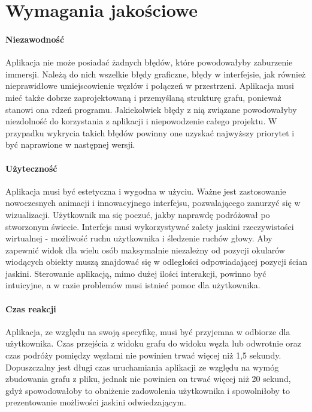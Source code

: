 \section{Wymagania jakościowe}

\paragraph{Niezawodność}
Aplikacja nie może posiadać żadnych błędów, które powodowałyby zaburzenie immersji. Należą do nich wszelkie błędy graficzne, błędy w interfejsie, jak również nieprawidłowe umiejscowienie węzłów i połączeń w przestrzeni. Aplikacja musi mieć także dobrze zaprojektowaną i przemyślaną strukturę grafu, ponieważ stanowi ona rdzeń programu. Jakiekolwiek błędy z nią związane powodowałyby niezdolność do korzystania z aplikacji i niepowodzenie całego projektu. W przypadku wykrycia takich błędów powinny one uzyskać najwyższy priorytet i być naprawione w następnej wersji.

\paragraph{Użyteczność}
Aplikacja musi być estetyczna i wygodna w użyciu. Ważne jest zastosowanie nowoczesnych animacji i innowacyjnego interfejsu, pozwalającego zanurzyć się w wizualizacji. Użytkownik ma się poczuć, jakby naprawdę podróżował po stworzonym świecie. Interfejs musi wykorzystywać zalety jaskini rzeczywistości wirtualnej - możliwość ruchu użytkownika i śledzenie ruchów głowy. Aby zapewnić widok dla wielu osób maksymalnie niezależny od pozycji okularów wiodących obiekty muszą znajdować się w odległości odpowiadającej pozycji ścian jaskini. Sterowanie aplikacją, mimo dużej ilości interakcji, powinno być intuicyjne, a w razie problemów musi istnieć pomoc dla użytkownika.

\paragraph{Czas reakcji}
Aplikacja, ze względu na swoją specyfikę, musi być przyjemna w odbiorze dla użytkownika. Czas przejścia z widoku grafu do widoku węzła lub odwrotnie oraz czas podróży pomiędzy węzłami nie powinien trwać więcej niż 1,5 sekundy. Dopuszczalny jest długi czas uruchamiania aplikacji ze względu na wymóg zbudowania grafu z pliku, jednak nie powinien on trwać więcej niż 20 sekund, gdyż spowodowałoby to obniżenie zadowolenia użytkownika i spowolniłoby to prezentowanie możliwości jaskini odwiedzającym. 
